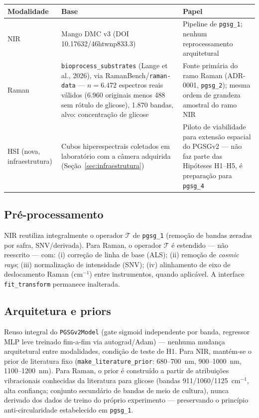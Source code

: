 \documentclass[11pt,a4paper]{article}
\begin{document}
\begin{center}
\begin{tabular}{p{2.4cm}p{6.2cm}p{5.5cm}}
\toprule
Modalidade & Base & Papel \\
\midrule
NIR & Mango DMC v3 (DOI 10.17632/46htwnp833.3) & Pipeline de \texttt{pgsg\_1}; nenhum reprocessamento arquitetural \\
Raman & \texttt{bioprocess\_substrates} (Lange et al., 2026), via RamanBench/\texttt{raman-data} --- $n=6.472$ espectros reais válidos (6.960 originais menos 488 sem rótulo de glicose), 1.870 bandas, alvo: concentração de glicose & Fonte primária do ramo Raman (ADR-0001, \texttt{pgsg\_2}); mesma ordem de grandeza amostral do ramo NIR \\
HSI (nova, infraestrutura) & Cubos hiperespectrais coletados em laboratório com a câmera adquirida (Seção~\ref{sec:infraestrutura}) & Piloto de viabilidade para extensão espacial do PGSGv2 --- não faz parte das Hipóteses H1--H5, é preparação para \texttt{pgsg\_4} \\
\bottomrule
\end{tabular}
\end{center}

\subsection{Pré-processamento}
NIR reutiliza integralmente o operador $\mathcal{T}$ de \texttt{pgsg\_1} (remoção de bandas zeradas por safra, SNV/derivada). Para Raman, o operador $\mathcal{T}$ é estendido --- não reescrito --- com: (i) correção de linha de base (ALS); (ii) remoção de \emph{cosmic rays}; (iii) normalização de intensidade (SNV); (iv) alinhamento de eixo de deslocamento Raman (cm$^{-1}$) entre instrumentos, quando aplicável. A interface \texttt{fit\_transform} permanece inalterada.

\subsection{Arquitetura e priors}
Reuso integral do \texttt{PGSGv2Model} (gate sigmoid independente por banda, regressor MLP leve treinado fim-a-fim via autograd/Adam) --- nenhuma mudança arquitetural entre modalidades, condição de teste de H1. Para NIR, mantém-se o prior de literatura fixo (\texttt{make\_literature\_prior}: 680--700~nm, 900--1000~nm, 1100--1200~nm). Para Raman, o prior é construído a partir de atribuições vibracionais conhecidas da literatura para glicose (bandas 911/1060/1125~cm$^{-1}$, alta confiança; conjunto secundário de bandas de meio de cultura), nunca derivado dos dados de treino do próprio experimento --- preservando o princípio anti-circularidade estabelecido em \texttt{pgsg\_1}.
\end{document}

